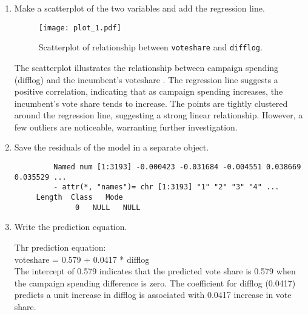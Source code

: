 \documentclass[12pt,letterpaper]{article}
\begin{document}
\begin{enumerate}
		
		
		\item Make a scatterplot of the two variables and add the regression line. 		
		\vspace{.15cm}
		 
		\vspace{.15cm}
		\begin{figure}[h!]\centering
			
			\caption{\footnotesize Scatterplot of relationship between \texttt{voteshare}  and  \texttt{difflog}.}
			\label{fig:plot_1}
			\texttt{[image: plot\_1.pdf]}
		\end{figure}
		\noindent The scatterplot illustrates the relationship between campaign spending (difflog) and the incumbent's voteshare . The regression line suggests a positive correlation, indicating that as campaign spending increases, the incumbent's vote share tends to increase. The points are tightly clustered around the regression line, suggesting a strong linear relationship. However, a few outliers are noticeable, warranting further investigation. 
		\vspace{80.15cm}
		\item Save the residuals of the model in a separate object.
		
		\vspace{.15cm}
		 
		\vspace{.15cm}
		\begin{footnotesize}
			
		\begin{verbatim}
		 Named num [1:3193] -0.000423 -0.031684 -0.004551 0.038669 0.035529 ...
		 - attr(*, "names")= chr [1:3193] "1" "2" "3" "4" ...
	 Length  Class   Mode 
		      0   NULL   NULL 
		\end{verbatim}
		\end{footnotesize}
		
		\item Write the prediction equation.
		
		\vspace{.15cm}
		 
		\vspace{.15cm}
		\noindent Thr prediction equation:\\
		\vspace{.15cm}
		voteshare = 0.579 + 0.0417  * difflog\\
		\noindent The intercept of 0.579 indicates that the predicted vote share is 0.579 when the campaign spending difference is zero. 
		The coefficient for difflog (0.0417) predicts a unit increase in difflog is associated with 0.0417 increase in vote share.
		
	\end{enumerate}
	
\end{document}
